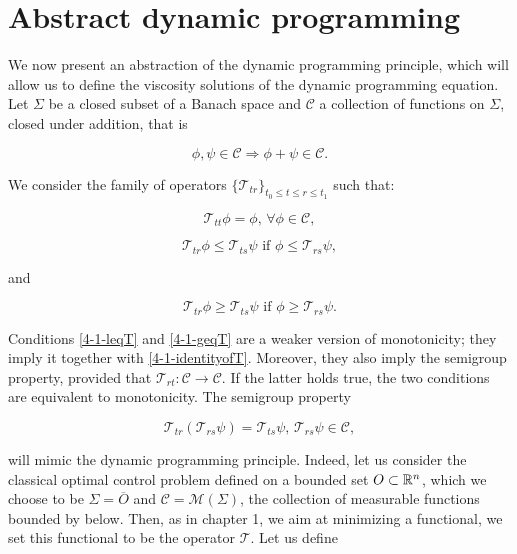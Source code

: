 \section{Abstract dynamic programming}

We now present an abstraction of the dynamic programming principle, which will allow us to define the viscosity solutions of the dynamic programming 
equation. Let $\Sigma$ be a closed subset of a Banach space and $\mathcal{C}$ a collection of functions on $\Sigma$, closed under addition, that is

\[\phi,\psi\in\mathcal{C}\Rightarrow \phi+\psi\in\mathcal{C}.\]

We consider the family of operators $\{\mathcal{T}_{tr}\}_{t_0\leq t\leq r\leq t_1}$ such that: 

\begin{equation}\label{4-1-identityofT}
    \mathcal{T}_{tt}\phi = \phi,\, \forall\phi\in\mathcal{C},
\end{equation}

\begin{equation}\label{4-1-leqT}
    \mathcal{T}_{tr}\phi\leq\mathcal{T}_{ts}\psi \text{ if } \phi\leq \mathcal{T}_{rs}\psi,
\end{equation}

and

\begin{equation}\label{4-1-geqT}
    \mathcal{T}_{tr}\phi\geq\mathcal{T}_{ts}\psi \text{ if } \phi\geq \mathcal{T}_{rs}\psi.
\end{equation}

Conditions \ref{4-1-leqT} and \ref{4-1-geqT} are a weaker version of monotonicity; they imply it together with \ref{4-1-identityofT}. 
Moreover, they also imply the semigroup property, provided that $\mathcal{T}_{rt}:\mathcal{C}\rightarrow\mathcal{C}$. If the latter holds true,
the two conditions are equivalent to monotonicity. The semigroup property

\begin{equation}
    \mathcal{T}_{tr}\left(\mathcal{T}_{rs}\psi\right)=\mathcal{T}_{ts}\psi,\,\mathcal{T}_{rs}\psi\in\mathcal{C},
\end{equation}

will mimic the dynamic programming principle. Indeed, let us consider the classical optimal control problem defined on a bounded set 
$O\subset\mathbb{R}^n$, which we choose to be $\Sigma=\overline{O}$ and $\mathcal{C}=\mathcal{M}(\Sigma)$, the collection of measurable functions bounded by below. Then, as in chapter 1, we aim at minimizing a functional, 
we set this functional to be the operator $\mathcal{T}$. Let us define

